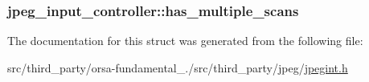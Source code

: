 \subsubsection[{has\+\_\+multiple\+\_\+scans}]{ jpeg\+\_\+input\+\_\+controller\+::has\+\_\+multiple\+\_\+scans}\label{structjpeg__input__controller_a6f02f9c18464bfbf30b27f5a43c2665a}


The documentation for this struct was generated from the following file\+:\begin{DoxyCompactItemize}
\item 
src/third\+\_\+party/orsa-\/fundamental\+\_./src/third\+\_\+party/jpeg/\hyperlink{jpegint_8h}{jpegint.\+h}\end{DoxyCompactItemize}
